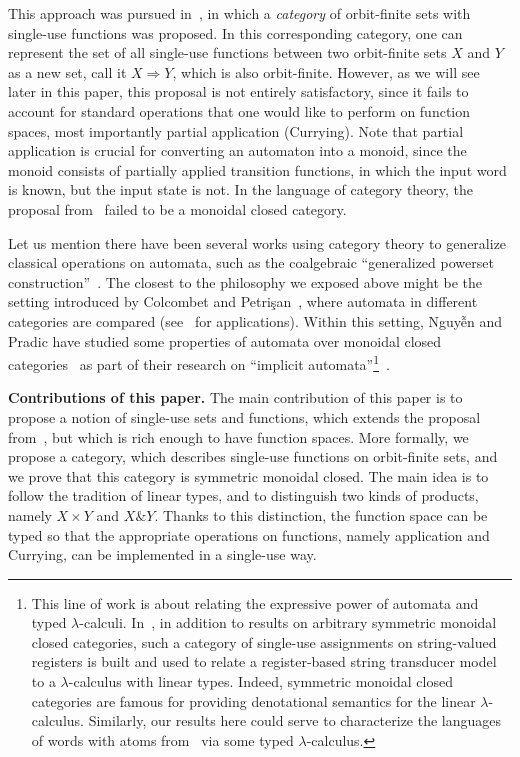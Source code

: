 This approach was pursued in~\cite{stefanski-phd}, in which a \emph{category} of orbit-finite sets with single-use functions was proposed. In this corresponding category,  one can represent the set of all single-use functions between two orbit-finite sets $X$ and $Y$ as a new set, call it $X \Rightarrow Y$, which is  also orbit-finite.  However, as we will see later in this paper, this proposal is not entirely satisfactory, since it fails to account for standard operations that one would like to perform on function spaces, most importantly partial application (Currying). Note that partial application is crucial for converting an automaton into a monoid, since the monoid consists of partially applied transition functions, in which the input word is known, but the input state is not. In the language of category theory, the proposal from~\cite{stefanski-phd} failed to be a monoidal closed category.

Let us mention there have been several works using category theory to generalize classical operations on automata, such as the coalgebraic ``generalized powerset construction''~\cite{DBLP:journals/corr/abs-1302-1046}. The closest to the philosophy we exposed above might be the setting introduced by Colcombet and Petrişan~\cite{colcombet2020automata}, where automata in different categories are compared (see~\cite{ColcombetPS21,Aristote24} for applications). Within this setting, Nguy{\~{ê}}n and Pradic have studied some properties of automata over monoidal closed categories~\cite[Sections~1.2.3~and~4.7--4.8]{titoPhD} as part of their research on ``implicit automata''\footnote{\label{ftn:iatlc}This line of work is about relating the expressive power of automata and typed $\lambda$-calculi. In~\cite{IATLC2,titoPhD}, in addition to results on arbitrary symmetric monoidal closed categories, such a category of single-use assignments on string-valued registers is built and used to relate a register-based string transducer model to a $\lambda$-calculus with linear types. Indeed, symmetric monoidal closed categories are famous for providing denotational semantics for the linear $\lambda$-calculus. Similarly, our results here could serve to characterize the languages of words with atoms from~\cite{bojanczykstefanski2020} via some typed $\lambda$-calculus.}~\cite{IATLC,IATLC2,titoPhD}.

 \textbf{Contributions of this paper.}
The main contribution of this paper is to propose a notion of single-use sets and functions, which extends the proposal from~\cite{stefanski-phd}, but which is rich enough to have function spaces. More formally, we propose a category, which describes single-use functions on orbit-finite sets, and we prove that this category is symmetric monoidal closed. 
The main idea is to follow the tradition of linear types, and to  distinguish two kinds of products, namely $X \times Y$ and $X \& Y$. Thanks to this distinction, the function space can be typed so that the appropriate operations on functions, namely application and Currying, can be implemented in a single-use way. 

